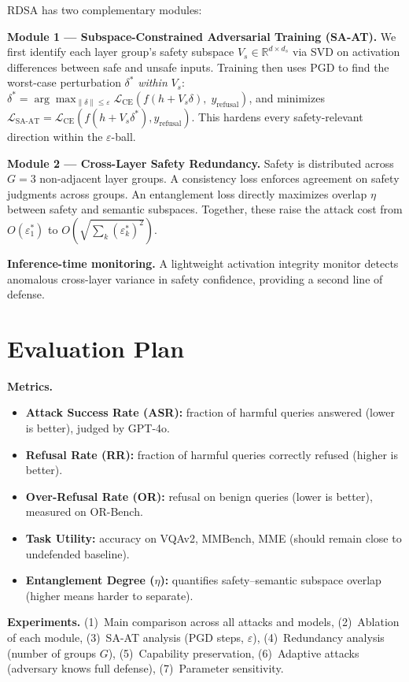 \documentclass[11pt]{article}
\begin{document}
RDSA has two complementary modules:

\textbf{Module 1 --- Subspace-Constrained Adversarial Training (SA-AT).}
We first identify each layer group's safety subspace $V_s \in \mathbb{R}^{d \times d_s}$ via SVD on activation differences between safe and unsafe inputs. Training then uses PGD to find the worst-case perturbation $\delta^*$ \emph{within} $V_s$:
$\delta^* = \arg\max_{\|\delta\| \leq \varepsilon} \mathcal{L}_{\text{CE}}(f(h + V_s \delta),\; y_{\text{refusal}})$,
and minimizes $\mathcal{L}_{\text{SA-AT}} = \mathcal{L}_{\text{CE}}(f(h + V_s \delta^*), y_{\text{refusal}})$. This hardens every safety-relevant direction within the $\varepsilon$-ball.

\textbf{Module 2 --- Cross-Layer Safety Redundancy.}
Safety is distributed across $G{=}3$ non-adjacent layer groups. A consistency loss enforces agreement on safety judgments across groups. An entanglement loss directly maximizes overlap $\eta$ between safety and semantic subspaces. Together, these raise the attack cost from $O(\varepsilon_1^*)$ to $O\!\left(\sqrt{\sum_k (\varepsilon_k^*)^2}\right)$.

\textbf{Inference-time monitoring.} A lightweight activation integrity monitor detects anomalous cross-layer variance in safety confidence, providing a second line of defense.

\section{Evaluation Plan}

\textbf{Metrics.}
\begin{itemize}
  \item \textbf{Attack Success Rate (ASR):} fraction of harmful queries answered (lower is better), judged by GPT-4o.
  \item \textbf{Refusal Rate (RR):} fraction of harmful queries correctly refused (higher is better).
  \item \textbf{Over-Refusal Rate (OR):} refusal on benign queries (lower is better), measured on OR-Bench.
  \item \textbf{Task Utility:} accuracy on VQAv2, MMBench, MME (should remain close to undefended baseline).
  \item \textbf{Entanglement Degree ($\eta$):} quantifies safety--semantic subspace overlap (higher means harder to separate).
\end{itemize}

\textbf{Experiments.} (1)~Main comparison across all attacks and models, (2)~Ablation of each module, (3)~SA-AT analysis (PGD steps, $\varepsilon$), (4)~Redundancy analysis (number of groups $G$), (5)~Capability preservation, (6)~Adaptive attacks (adversary knows full defense), (7)~Parameter sensitivity.
\end{document}
